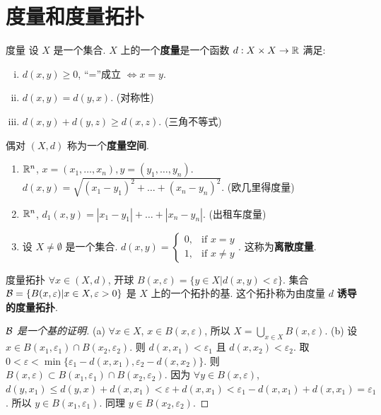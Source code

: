 \section{度量和度量拓扑}

\begin{definition}{度量}
    设 $X$ 是一个集合. $X$ 上的一个\textbf{度量}是一个函数 $d:X\times X\to \mathbb{R}$ 满足:
    \begin{enumerate}[(i)]
        \item $d(x,y)\ge 0$, “=”成立 $\Leftrightarrow x=y$.
        \item $d(x,y)=d(y,x)$. (对称性)
        \item $d(x,y)+d(y,z)\ge d(x,z)$. (三角不等式)
    \end{enumerate}
    偶对 $(X,d)$ 称为一个\textbf{度量空间}.
\end{definition}

\begin{instance}
    \begin{enumerate}
        \item $\mathbb{R}^n$, $x=(x_1,\dots,x_n), y=(y_1,\dots,y_n)$.
        $d(x,y)=\sqrt{(x_1-y_1)^2+\dots+(x_n-y_n)^2}$. (欧几里得度量)
        \item $\mathbb{R}^n$, $d_1(x,y)=|x_1-y_1|+\dots+|x_n-y_n|$. (出租车度量)
        \item 设 $X\neq\emptyset$ 是一个集合.
        $d(x,y)=\begin{cases} 0, & \text{if } x=y \\ 1, & \text{if } x\neq y \end{cases}$. 这称为\textbf{离散度量}.
    \end{enumerate}
\end{instance}

\begin{definition}{度量拓扑}
    $\forall x\in (X,d)$, 开球 $B(x,\varepsilon)=\{y\in X | d(x,y)<\varepsilon\}$.
    集合 $\mathcal{B}=\{B(x,\varepsilon)|x\in X, \varepsilon>0\}$ 是 $X$ 上的一个拓扑的基.
    这个拓扑称为由度量 $d$ \textbf{诱导的度量拓扑}.
\end{definition}

\begin{proof}[$\mathcal{B}$ 是一个基的证明]
    (a) $\forall x\in X$, $x\in B(x,\varepsilon)$, 所以 $X=\bigcup_{x\in X}B(x,\varepsilon)$.
    (b) 设 $x\in B(x_1,\varepsilon_1)\cap B(x_2,\varepsilon_2)$.
    则 $d(x,x_1)<\varepsilon_1$ 且 $d(x,x_2)<\varepsilon_2$.
    取 $0<\varepsilon < \min\{\varepsilon_1-d(x,x_1), \varepsilon_2-d(x,x_2)\}$.
    则 $B(x,\varepsilon)\subset B(x_1,\varepsilon_1)\cap B(x_2,\varepsilon_2)$.
    因为 $\forall y\in B(x,\varepsilon)$, $d(y,x_1)\le d(y,x)+d(x,x_1) < \varepsilon+d(x,x_1) < \varepsilon_1-d(x,x_1)+d(x,x_1)=\varepsilon_1$.
    所以 $y\in B(x_1,\varepsilon_1)$.
    同理 $y\in B(x_2,\varepsilon_2)$.
\end{proof}

